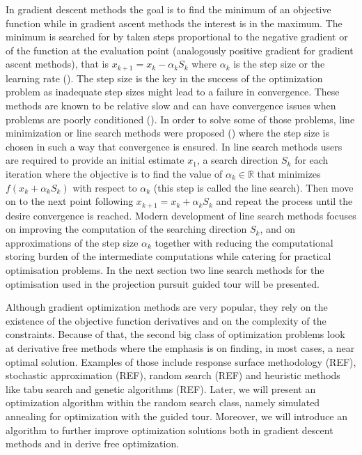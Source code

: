 In gradient descent methods the goal is to find the minimum of an objective function while in gradient ascent methods the interest is in the maximum. The minimum is searched for by taken steps proportional to the negative gradient or of the function at the evaluation point (analogously positive gradient for gradient ascent methods), that is \(x_{k+1} = x_k -\alpha_kS_k\) where \(\alpha_k\) is the step size or the learning rate (\citet{fletcher2013practical}). The step size is the key in the success of the optimization problem as inadequate step sizes might lead to a failure in convergence. These methods are known to be relative slow and can have convergence issues when problems are poorly conditioned (\citet{trefethen1997numerical}). In order to solve some of those problems, line minimization or line search methods were proposed (\citet{shi2004convergence}) where the step size is chosen in such a way that convergence is ensured. In line search methods users are required to provide an initial estimate \(x_{1}\), a search direction \(S_k\) for each iteration where the objective is to find the value of \(\alpha_k \in \mathbb{R}\) that minimizes \(f(x_k + \alpha_kS_k)\) with respect to \(\alpha_k\) (this step is called the line search). Then move on to the next point following \(x_{k+1} = x_k + \alpha_kS_k\) and repeat the process until the desire convergence is reached.
Modern development of line search methods focuses on improving the computation of the searching direction \(S_{k}\), and on approximations of the step size \(\alpha_k\) together with reducing the computational storing
burden of the intermediate computations while catering for practical optimisation problems. In the next section two line search methods for the optimisation used in the projection pursuit guided tour will be presented.

Although gradient optimization methods are very popular, they rely on the existence of the objective function derivatives and on the complexity of the constraints. Because of that, the second big class of optimization problems look at derivative free methods where the emphasis is on finding, in most cases, a near optimal solution. Examples of those include response surface methodology (REF), stochastic approximation (REF),
random search (REF) and heuristic methods like tabu search and genetic algorithms (REF). Later, we will present an optimization algorithm within the random search class, namely simulated annealing for optimization with the guided tour. Moreover, we will introduce an algorithm to further improve optimization solutions both in gradient descent methods and in derive free optimization.

